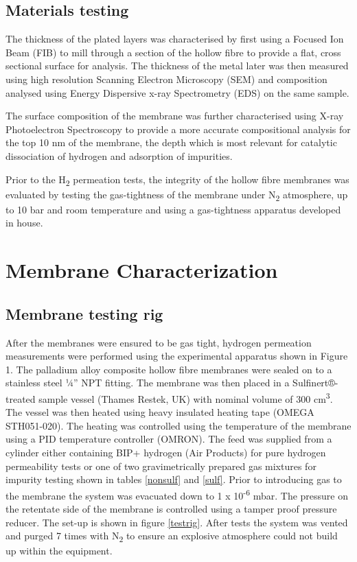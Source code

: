 \subsection{Materials testing}\label{MatTest}
The thickness of the plated layers was characterised by first using a Focused Ion Beam (FIB) to mill through a section of the hollow fibre to provide a flat, cross sectional surface for analysis. The thickness of the metal later was then measured using high resolution Scanning Electron Microscopy (SEM) and composition analysed using Energy Dispersive x-ray Spectrometry (EDS) on the same sample. 

The surface composition of the membrane was further characterised using X-ray Photoelectron Spectroscopy to provide a more accurate compositional analysis for the top 10 nm of the membrane, the depth which is most relevant for catalytic dissociation of hydrogen and adsorption of impurities.

Prior to the H\textsubscript{2} permeation tests, the integrity of the hollow fibre membranes was evaluated by testing the gas-tightness of the membrane under N\textsubscript{2} atmosphere, up to 10 bar and room temperature and using a gas-tightness apparatus developed in house. \cite{GouveiaGil2015}

\section{Membrane Characterization}

\subsection{Membrane testing rig}
After the membranes were ensured to be gas tight, hydrogen permeation measurements were performed using the experimental apparatus shown in Figure 1. The palladium alloy composite hollow fibre membranes were sealed on to a stainless steel ¼” NPT fitting. The membrane was then placed in a Sulfinert®-treated sample vessel (Thames Restek, UK) with nominal volume of 300 cm\textsuperscript{3}. The vessel was then heated using heavy insulated heating tape (OMEGA STH051-020). The heating was controlled using the temperature of the membrane using a PID temperature controller (OMRON). The feed was supplied from a cylinder either containing BIP+ hydrogen (Air Products) for pure hydrogen permeability tests or one of two gravimetrically prepared gas mixtures for impurity testing shown in tables \ref{nonsulf} and \ref{sulf}. Prior to introducing gas to the membrane the system was evacuated down to 1 x 10\textsuperscript{-6} mbar. The pressure on the retentate side of the membrane is controlled using a tamper proof pressure reducer. The set-up is shown in figure \ref{testrig}. After tests the system was vented and purged 7 times with N\textsubscript{2} to ensure an explosive atmosphere could not build up within the equipment.

